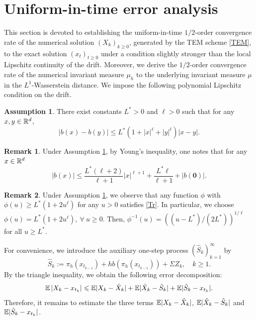 \documentclass[aap]{imsart}
\theoremstyle{plain}
\theoremstyle{definition}
\newtheorem{remark}{Remark}
\newtheorem{assumption}{Assumption}
\begin{document}
\section{Uniform-in-time error analysis}
This section is devoted to establishing the uniform-in-time \(1/2\)-order convergence rate of the numerical solution \((X_k)_{k\geqslant0}\), generated by the TEM scheme \eqref{TEM}, to the exact solution \((x_t)_{t\geqslant0}\) under a condition slightly stronger than the local Lipschitz continuity of the drift.
Moreover, we derive the \(1/2\)-order convergence rate of the numerical invariant measure \(\mu_h\) to the underlying invariant measure \(\mu\) in the \(L^1\)-Wasserstein distance.
We impose the following polynomial Lipschitz condition on the drift.
	\begin{assumption}\label{A2}
		There exist constants $L^*>0$ and $\ell>0$ such that for any $x, y\in\mathbb{R}^d$,
		\begin{equation*}
			|b(x)-b(y)|\leqslant L^*(1+|x|^\ell+|y|^\ell)|x-y|.
		\end{equation*}
	\end{assumption}
	
\begin{remark}\label{PG}
			Under Assumption \ref{A2}, by Young's inequality, one notes that for any $x\in\mathbb{R}^d$
			\[|b(x)|\leq \frac{L^*(\ell+2)}{\ell+1}|x|^{\ell+1}+\frac{L^*\ell}{\ell+1}+|b(\mathbf{0})|.\]
\end{remark}

\begin{remark}\label{mapping form} 
Under Assumption \ref{A2}, we observe  that any function $\phi$ with $\phi(u)\geqslant L^*(1+2u^\ell)$ for any $u>0$ satisfies \eqref{Tr}. In particular, we choose
$\phi(u) = L^*(1+2u^\ell),~\forall~u\geqslant0$. Then, $\phi^{-1}(u) = ((u-L^*)/(2L^*))^{1/\ell}$ for all $u\geqslant L^*$. 
\end{remark}
	
For convenience, we introduce the auxiliary one-step process $(\hat{S}_{k})_{k=1}^\infty$ by
\begin{equation}\label{S}
\hat{S}_{k}:= \pi_h(x_{t_{k-1}}) + hb(\pi_h(x_{t_{k-1}})) + \Sigma Z_{k},\quad k\geqslant 1.
\end{equation}
By the triangle inequality, we obtain the following error decomposition: 
\begin{align*}
\mathbb{E}\left|X_{k}-x_{t_{k}}\right|\leqslant\mathbb{E}|X_{k}-\hat{X}_{k}|+\mathbb{E} |\hat{X}_{k}-\hat{S}_{k}|+ \mathbb{E} |\hat{S}_{k}-x_{t_{k}}|.
\end{align*}
Therefore, it remains to estimate the three terms $\mathbb{E}|X_{k}-\hat{X}_{k}|$, $\mathbb{E}|\hat{X}_{k}-\hat{S}_{k}|$ and $\mathbb{E}|\hat{S}_{k}-x_{t_{k}}|$. 
	
\end{document}
